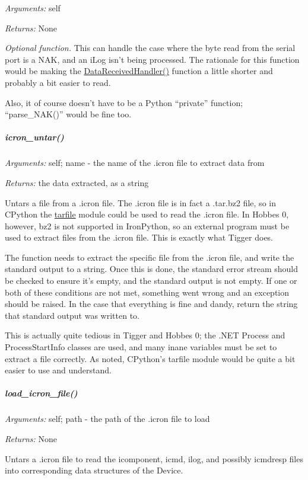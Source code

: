 \documentclass[12pt,letterpaper]{article}
\begin{document}
\emph{Arguments:} self

\emph{Returns:} None

\emph{Optional function.} This can handle the case where the byte read from the serial port is a NAK, and an iLog isn't being processed. The rationale for this function would be making the \hyperref[4.3.1.2.2]{DataReceivedHandler()} function a little shorter and probably a bit easier to read.

Also, it of course doesn't have to be a Python ``private'' function; ``parse\_NAK()'' would be fine too.



%
%
\subparagraph{icron\_untar()}
\label{4.3.1.2.4}

\emph{Arguments:} self; name - the name of the .icron file to extract data from

\emph{Returns:} the data extracted, as a string

Untars a file from a .icron file. The .icron file is in fact a .tar.bz2 file, so in CPython the \href{http://docs.python.org/library/tarfile.html}{tarfile} module could be used to read the .icron file. In Hobbes 0, however, bz2 is not supported in IronPython, so an external program must be used to extract files from the .icron file. This is exactly what Tigger does.

The function needs to extract the specific file from the .icron file, and write the standard output to a string. Once this is done, the standard error stream should be checked to ensure it's empty, and the standard output is not empty. If one or both of these conditions are not met, something went wrong and an exception should be raised. In the case that everything is fine and dandy, return the string that standard output was written to.

This is actually quite tedious in Tigger and Hobbes 0; the .NET Process and ProcessStartInfo classes are used, and many inane variables must be set to extract a file correctly. As noted, CPython's tarfile module would be quite a bit easier to use and understand.



%
%
\subparagraph{load\_icron\_file()}
\label{4.3.1.2.5}

\emph{Arguments:} self; path - the path of the .icron file to load

\emph{Returns:} None

Untars a .icron file to read the icomponent, icmd, ilog, and possibly icmdresp files into corresponding data structures of the Device.
\end{document}
